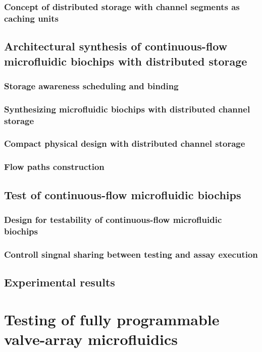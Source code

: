 \documentclass{article}
\begin{document}
  \subsubsection{Concept of distributed storage with channel segments as caching units}

\subsection{Architectural synthesis of continuous-flow microfluidic biochips with distributed storage} 
  \subsubsection{Storage awareness scheduling and binding}
  \subsubsection{Synthesizing microfluidic biochips with distributed channel storage}
  \subsubsection{Compact physical design with distributed channel storage}
  \subsubsection{Flow paths construction}

\subsection{Test of continuous-flow microfluidic biochips}
  \subsubsection{Design for testability of continuous-flow microfluidic biochips}
  \subsubsection{Controll singnal sharing between testing and assay execution}

\subsection{Experimental results}

\section{Testing of fully programmable valve-array microfluidics}
\end{document}

